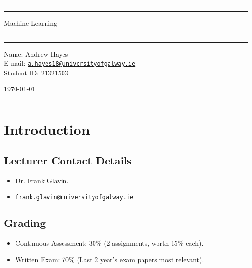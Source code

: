\documentclass[a4paper,11pt]{article}
\author{Andrew Hayes}
\begin{document}
\begin{titlepage}
    \begin{center}
        \hrule
        \vspace*{0.6cm}
        \vspace*{0.6cm}
        \hrule
        \LARGE
        \vspace{0.5cm}
            Machine Learning
        \vspace{0.5cm}
        \hrule

        \vfill
        \vfill

        \hrule
        \begin{minipage}{0.495\textwidth} 
            \vspace{0.4em}
            \raggedright
            \normalsize 
            Name: Andrew Hayes \\
            E-mail: \href{mailto://a.hayes18@universityofgalway.ie}{\texttt{a.hayes18@universityofgalway.ie}}  \hfill\\   
            Student ID: 21321503 \hfill
        \end{minipage}
        \begin{minipage}{0.495\textwidth} 
            \raggedleft
            \vspace*{0.8cm}
            \Large
            \today
            \vspace*{0.6cm}
        \end{minipage}
        \medskip\hrule 
    \end{center}
\end{titlepage}

\newpage
\tableofcontents
\newpage
\setcounter{page}{1}

\section{Introduction}
\subsection{Lecturer Contact Details}
\begin{itemize}
    \item   Dr. Frank Glavin.
    \item   \href{mailto://frank.glavin@universityofgalway.ie}{\texttt{frank.glavin@universityofgalway.ie}}
\end{itemize}

\subsection{Grading}
\begin{itemize}
    \item   Continuous Assessment: 30\% (2 assignments, worth 15\% each).
    \item   Written Exam: 70\% (Last 2 year's exam papers most relevant).
\end{itemize}
\end{document}
